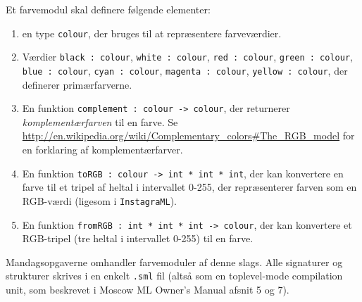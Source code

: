 \documentclass[a4paper,12pt]{article}
\begin{document}
Et farvemodul skal definere følgende elementer:

\begin{enumerate}[1.]
\item en type \lstinline{colour}, der bruges til at repræsentere
  farveværdier.

\item Værdier \lstinline{black : colour}, \lstinline{white : colour},
  \lstinline{red : colour}, \lstinline{green : colour},
  \lstinline{blue : colour}, \lstinline{cyan : colour}, \lstinline{magenta : colour},
  \lstinline{yellow : colour}, der definerer primærfarverne.

\item En funktion \lstinline{complement : colour -> colour}, der
  returnerer \emph{komplementærfarven} til en farve.  Se
  \url{http://en.wikipedia.org/wiki/Complementary_colors#The_RGB_model}
  for en forklaring af komplementærfarver.

\item En funktion \lstinline{toRGB : colour -> int * int * int}, der kan
  konvertere en farve til et tripel af heltal i intervallet 0-255, der
  repræsenterer farven som en RGB-værdi (ligesom i
  \lstinline{InstagraML}).

\item En funktion \lstinline{fromRGB : int * int * int -> colour}, der
  kan konvertere et RGB-tripel (tre heltal i intervallet 0-255) til en
  farve.
\end{enumerate}

Mandagsopgaverne omhandler farvemoduler af denne slags.  Alle
signaturer og strukturer skrives i en enkelt \texttt{.sml} fil (altså
som en toplevel-mode compilation unit, som beskrevet i Moscow ML
Owner's Manual afsnit 5 og 7).
\end{document}
